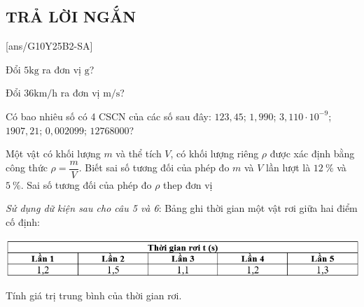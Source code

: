 
\subsection{TRẢ LỜI NGẮN}
\setcounter{ex}{0}
[ans/G10Y25B2-SA]
\begin{ex}
	Đổi $5 \si{\kilo\gram}$ ra đơn vị $\si{\gram}$?
\end{ex}

\begin{ex}
	Đổi $36 \si{\kilo\meter/\hour}$ ra đơn vị $\si{\meter/\second}$?
\end{ex}

\begin{ex}
	Có bao nhiêu số có 4 CSCN của các số sau đây: $123,45$; $1,990$; $3,110\cdot 10^{-9}$; $1907,21$; $0,002099$; $12768000$?
\end{ex}


\begin{ex}
	Một vật có khối lượng $m$ và thể tích $V$, có khối lượng riêng $\rho$ được xác định bằng công thức $\rho =\dfrac{m}{V}$. Biết sai số tương đối của phép đo $m$ và $V$ lần lượt là $\SI{12}{\percent}$ và $\SI{5}{\percent}$. Sai số tương đối của phép đo $\rho$ thep đơn vị %
\end{ex}

\textit {Sử dụng dữ kiện sau cho câu 5 và 6}: Bảng ghi thời gian một vật rơi giữa hai điểm cố định:
\begin{center}
	\includegraphics[scale=0.7]{figs/G10Y25B2-8}
\end{center}

\begin{ex} 
	Tính giá trị trung bình của thời gian rơi.
\end{ex}

